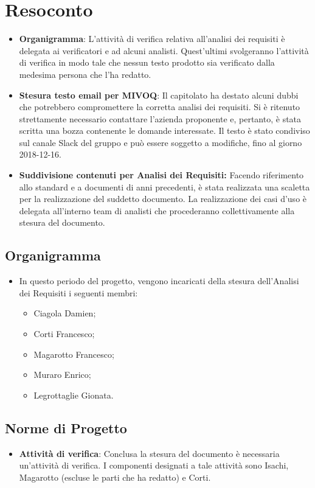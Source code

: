 \documentclass[a4paper, oneside, openany, dvipsnames, table]{article}
\begin{document}
\section{Resoconto}
\begin{itemize}
\item \textbf{Organigramma}: L'attività di verifica relativa all'analisi dei requisiti è delegata ai verificatori e ad alcuni analisti. Quest'ultimi svolgeranno l'attività di verifica in modo tale che nessun testo prodotto sia verificato dalla medesima persona che l'ha redatto. 
\item \textbf{Stesura testo email per MIVOQ}: Il capitolato ha destato alcuni dubbi che potrebbero compromettere la corretta analisi dei requisiti. Si è ritenuto strettamente necessario contattare l'azienda proponente e, pertanto, è stata scritta una bozza contenente le domande interessate. Il testo è stato condiviso sul canale Slack del gruppo e può essere soggetto a modifiche, fino al giorno 2018-12-16.
\item \textbf{Suddivisione contenuti per Analisi dei Requisiti:} Facendo riferimento allo standard e a documenti di anni precedenti, è stata realizzata una scaletta per la realizzazione del suddetto documento.
La realizzazione dei casi d'uso è delegata all'interno team di analisti che procederanno collettivamente alla stesura del documento.
\end{itemize}
\subsection{Organigramma}
\begin{itemize}
\item In questo periodo del progetto, vengono incaricati della stesura dell'Analisi dei Requisiti i seguenti membri:
	\begin{itemize}
	\item 	Ciagola Damien;
	\item	Corti Francesco;
	\item	Magarotto Francesco;
	\item	Muraro Enrico;
	\item	Legrottaglie Gionata.
	\end{itemize}
\end{itemize}

\subsection{Norme di Progetto}
\begin{itemize}
\item \textbf{Attività di verifica}: Conclusa la stesura del documento è necessaria un'attività di verifica. I componenti designati a tale attività sono Isachi, Magarotto (escluse le parti che ha redatto) e Corti.
\end{itemize}
\end{document}
